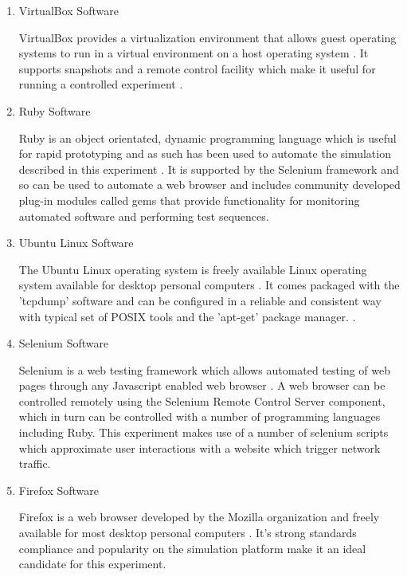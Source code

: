 \begin{enumerate}
  \item VirtualBox Software

  VirtualBox provides a virtualization environment that allows guest operating
  systems to run in a virtual environment on a host operating system
  \parencite{:fk}. It supports snapshots and a remote control facility which make
  it useful for running a controlled experiment \parencite{:uq}.

  \item Ruby Software

  Ruby is an object orientated, dynamic programming language which is useful for
  rapid prototyping and as such has been used to automate the simulation
  described in this experiment \parencite{:2010uq}. It is supported by the
  Selenium framework and so can be used to automate a web browser and includes
  community developed plug-in modules called gems that provide functionality for
  monitoring automated software and performing test sequences.

  \item Ubuntu Linux Software

  The Ubuntu Linux operating system is freely available Linux operating system
  available for desktop personal computers \parencite{:2010ly}. It comes
  packaged with the 'tcpdump' software and can be configured in a reliable and
  consistent way with typical set of POSIX tools and the 'apt-get' package
  manager. \parencite{Pereira:2011uq}.

  \item Selenium Software

  Selenium is a web testing framework which allows automated testing of web pages
  through any Javascript enabled web browser \parencite{:2010ys}. A web browser
  can be controlled remotely using the Selenium Remote Control Server component,
  which in turn can be controlled with a number of programming languages including
  Ruby. This experiment makes use of a number of selenium scripts which
  approximate user interactions with a website which trigger network traffic.

  \item Firefox Software

  Firefox is a web browser developed by the Mozilla organization and freely
  available for most desktop personal computers \parencite{Foundation:2011fk}.
  It's strong standards compliance \parencite{Hammond:2010fk} and popularity
  \parencite{:2010kx,:2010vn} on the simulation platform make it an ideal
  candidate for this experiment.


\end{enumerate}

